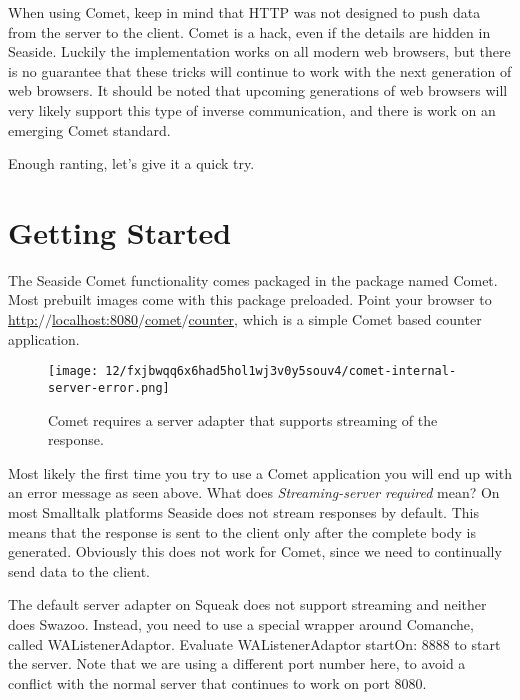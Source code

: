\documentclass[a4paper,10pt,twoside]{book}
\newcommand{\ct}[1]{{\small\ttfamily\textup{#1}}}
\begin{document}
When using Comet, keep in mind that HTTP was not designed to push data from the server to the client. Comet is a hack, even if the details are hidden in Seaside. Luckily the implementation works on all modern web browsers, but there is no guarantee that these tricks will continue to work with the next generation of web browsers. It should be noted that upcoming generations of web browsers will very likely support this type of inverse communication, and there is work on an emerging Comet standard.

Enough ranting, let's give it a quick try.

\section{Getting Started}
\label{book:web20:comet:gettingstarted}

The Seaside Comet functionality comes packaged in the package named Comet. Most prebuilt images come with this package preloaded. Point your browser to \href{http://localhost:8080/comet/counter}{http:$/$$/$localhost:8080$/$comet$/$counter}, which is a simple Comet based counter application.

\begin{figure}[h!tbp]
	\begin{center}
		\texttt{[image: 12/fxjbwqq6x6had5hol1wj3v0y5souv4/comet-internal-server-error.png]}
		\caption{Comet requires a server adapter that supports streaming of the response.\label{book:web20:comet:gettingstarted:cometinternalservererror}}
	\end{center}
\end{figure}


Most likely the first time you try to use a Comet application you will end up with an error message as seen above. What does \textit{Streaming-server required} mean? On most Smalltalk platforms Seaside does not stream responses by default. This means that the response is sent to the client only after the complete body is generated. Obviously this does not work for Comet, since we need to continually send data to the client.

The default server adapter on Squeak does not support streaming and neither does Swazoo. Instead, you need to use a special wrapper around Comanche, called \ct{WAListenerAdaptor}. Evaluate \ct{WAListenerAdaptor startOn: 8888} to start the server. Note that we are using a different port number here, to avoid a conflict with the normal server that continues to work on port \ct{8080}.
\end{document}
